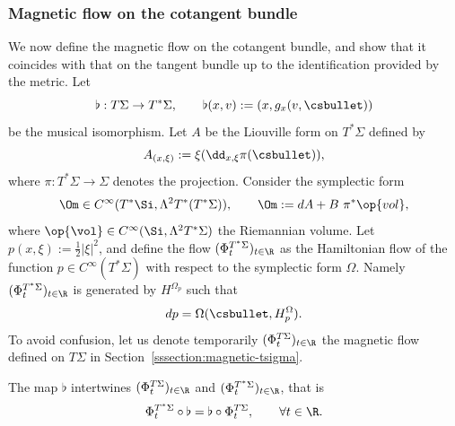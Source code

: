 \subsubsection{Magnetic flow on the cotangent bundle} \label{sssection:flow-cotangent}

We now define the magnetic flow on the cotangent bundle, and show that it coincides with that on the tangent bundle up to the identification provided by the metric. Let
\[
\flat : T\Sigma \to T^*\Sigma, \qquad \flat(x,v) := (x, g_x(v,\csbullet))
\]
be the musical isomorphism. Let $A$ be the Liouville
form on $T^*\Sigma$ defined by
\begin{equation}
\label{equation:liouville}
A_{(x, \xi) } := \xi (\dd_{x, \xi} \pi (\csbullet)),
\end{equation}
where $\pi : T^*\Sigma \to \Sigma$ denotes the projection. Consider the symplectic form
\[
\Om \in C^\infty(T^* \Si,\Lambda^2 T^*(T^*\Sigma)), \qquad \Om := dA + B~ \pi^*\op{vol},
\]
where $\op{\vol} \in C^\infty(\Si,\Lambda^2 T^*\Sigma)$ the Riemannian volume. Let $p(x,\xi) := \tfrac{1}{2} | \xi|^2$, and define the flow $(\Phi_t^{T^*\Sigma})_{t \in \R}$ as the Hamiltonian flow of the function $p \in C^\infty(T^*\Sigma)$ with respect to the symplectic form $\Omega$. Namely $(\Phi_t^{T^*\Sigma})_{t \in \R}$ is generated by $H^{\Omega_p}$ such that
\[
dp = \Omega(\csbullet, H^\Omega_p).
\]
To avoid confusion, let us denote temporarily $(\Phi_t^{T\Sigma})_{t \in \R}$ the magnetic flow defined on $T\Sigma$ in Section~\ref{sssection:magnetic-tsigma}.

\begin{lemma}
The map $\flat$ intertwines $(\Phi_t^{T\Sigma})_{t \in \R}$ and $(\Phi_t^{T^*\Sigma})_{t \in \R}$, that is
\[
\Phi_t^{T^*\Sigma} \circ \flat = \flat \circ \Phi_t^{T\Sigma}, \qquad \forall t \in \R.
\]
\end{lemma}

